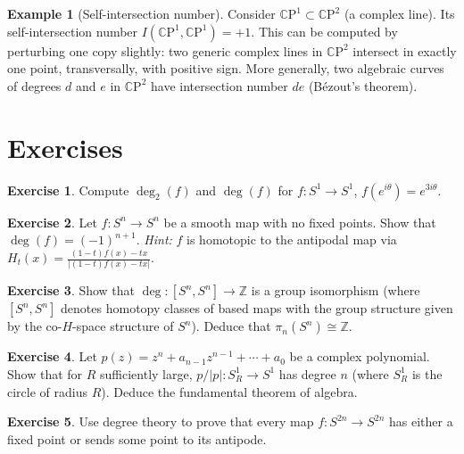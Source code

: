 \documentclass[12pt,a4paper,openany]{book}
\theoremstyle{definition}
\newtheorem{example}[theorem]{Example}
\newtheorem{exercise}{Exercise}[chapter]
\theoremstyle{remark}
\newcommand{\Z}{\mathbb{Z}}
\newcommand{\CP}{\mathbb{C}\mathrm{P}}
\newcommand{\abs}[1]{\left\lvert #1 \right\rvert}
\begin{document}
\begin{example}[Self-intersection number]\label{ex:self-intersection}
Consider $\CP^1 \subset \CP^2$ (a complex line). Its self-intersection
number $I(\CP^1,\CP^1) = +1$. This can be computed by perturbing
one copy slightly: two generic complex lines in $\CP^2$ intersect
in exactly one point, transversally, with positive sign.
More generally, two algebraic curves of degrees $d$ and $e$ in
$\CP^2$ have intersection number $de$ (B\'{e}zout's theorem).
\end{example}

\section{Exercises}\label{sec:exo-degree}

\begin{exercise}\label{exo:degree-1}
Compute $\deg_2(f)$ and $\deg(f)$ for $f\colon S^1\to S^1$,
$f(e^{i\theta}) = e^{3i\theta}$.
\end{exercise}

\begin{exercise}\label{exo:degree-2}
Let $f\colon S^n \to S^n$ be a smooth map with no fixed points.
Show that $\deg(f) = (-1)^{n+1}$. \emph{Hint:} $f$ is homotopic
to the antipodal map via
$H_t(x)=\frac{(1-t)f(x)-tx}{\abs{(1-t)f(x)-tx}}$.
\end{exercise}

\begin{exercise}\label{exo:degree-3}
Show that $\deg\colon [S^n,S^n] \to \Z$ is a group isomorphism
(where $[S^n,S^n]$ denotes homotopy classes of based maps with the
group structure given by the co-$H$-space structure of $S^n$).
Deduce that $\pi_n(S^n)\cong\Z$.
\end{exercise}

\begin{exercise}\label{exo:degree-4}
Let $p(z) = z^n + a_{n-1}z^{n-1}+\cdots+a_0$ be a complex polynomial.
Show that for $R$ sufficiently large, $p/\abs{p}\colon S^1_R \to S^1$
has degree $n$ (where $S^1_R$ is the circle of radius $R$). Deduce the
fundamental theorem of algebra.
\end{exercise}

\begin{exercise}\label{exo:degree-5}
Use degree theory to prove that every map $f\colon S^{2n}\to S^{2n}$
has either a fixed point or sends some point to its antipode.
\end{exercise}
\end{document}
